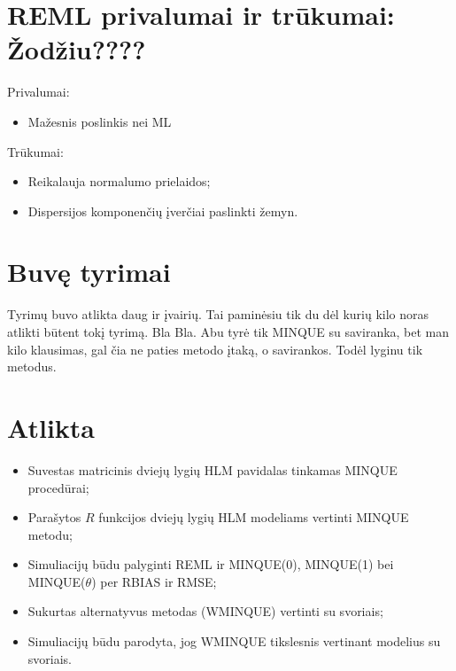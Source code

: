 \documentclass[12pt,a4paper]{article}
\begin{document}
\section{REML privalumai ir trūkumai: Žodžiu????}
Privalumai:
\begin{itemize}
\item Mažesnis poslinkis nei ML
\end{itemize}
Trūkumai:
\begin{itemize}
\item Reikalauja normalumo prielaidos;
\item Dispersijos komponenčių įverčiai paslinkti žemyn.
\end{itemize}

\section{Buvę tyrimai}
Tyrimų buvo atlikta daug ir įvairių. Tai paminėsiu tik du dėl kurių kilo noras atlikti būtent tokį tyrimą. Bla Bla. Abu tyrė tik MINQUE su saviranka, bet man kilo klausimas, gal čia ne paties metodo įtaką, o savirankos. Todėl lyginu tik metodus.

\section{Atlikta}

\begin{itemize}
\item Suvestas matricinis dviejų lygių HLM pavidalas tinkamas MINQUE procedūrai;
\item Parašytos $R$ funkcijos dviejų lygių HLM modeliams vertinti MINQUE metodu;
\item Simuliacijų būdu palyginti REML ir MINQUE(0), MINQUE(1) bei MINQUE($\theta$) per RBIAS ir RMSE;
\item Sukurtas alternatyvus metodas (WMINQUE) vertinti su svoriais;
\item Simuliacijų būdu parodyta, jog WMINQUE tikslesnis vertinant modelius su svoriais.
\end{itemize}
\end{document}
